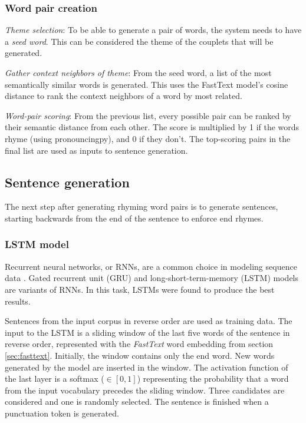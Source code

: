 \documentclass[11pt,a4paper]{article}
\newenvironment{tight_enumerate}{
\begin{enumerate}
\setlength{\itemsep}{0pt}
\setlength{\parskip}{0pt}
}{\end{enumerate}}
\begin{document}
\subsubsection{Word pair creation}
\begin{tight_enumerate}
	\item \textit{Theme selection}: To be able to generate a pair of words, the system needs to have a \textit{seed word}. This can be considered the theme of the couplets that will be generated.
	\item \textit{Gather context neighbors of theme}: From the seed word, a list of the most semantically similar words is generated. This uses the FastText model's cosine distance to rank the context neighbors of a word by most related.
	\item \textit{Word-pair scoring}: From the previous list, every possible pair can be ranked by their semantic distance from each other. The score is multiplied by 1 if the words rhyme (using pronouncingpy), and 0 if they don't. The top-scoring pairs in the final list are used as inputs to sentence generation.
\end{tight_enumerate}

\subsection{Sentence generation}
\label{sec:languagegen}

The next step after generating rhyming word pairs is to generate sentences, starting backwards from the end of the sentence to enforce end rhymes.

\subsubsection{LSTM model}
\label{sec:lstm}
Recurrent neural networks, or RNNs, are a common choice in modeling sequence data \cite{rnn}. Gated recurrent unit (GRU) \cite{gru} and long-short-term-memory (LSTM) models \cite{lstm} are variants of RNNs. In this task, LSTMs were found to produce the best results.

Sentences from the input corpus in reverse order are used as training data. The input to the LSTM is a sliding window of the last five words of the sentence in reverse order, represented with the \textit{FastText} word embedding from section \ref{sec:fasttext}. Initially, the window contains only the end word. New words generated by the model are inserted in the window. The activation function of the last layer is a softmax ($\in [0, 1]$) representing the probability that a word from the input vocabulary precedes the sliding window. Three candidates are considered and one is randomly selected. The sentence is finished when a punctuation token is generated.
\end{document}
